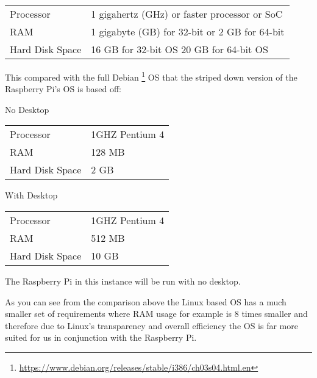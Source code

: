 
\vspace{5mm} 
\begin{center}
\begin{tabular}{| l | l |}
	\hline
	Processor & 1 gigahertz (GHz) or faster processor or SoC \\
	RAM & 1 gigabyte (GB) for 32-bit or 2 GB for 64-bit \\
	Hard Disk Space & 16 GB for 32-bit OS 20 GB for 64-bit OS \\
	\hline
\end{tabular}
\vspace{5mm} 
\end{center}

This compared with the full Debian \footnote{\url{https://www.debian.org/releases/stable/i386/ch03s04.html.en}} OS that the striped down version of the Raspberry Pi's OS is based off:

\begin{center}
No Desktop\\
\vspace{1mm} 
\begin{tabular}{| l | l |}
	\hline
	Processor & 1GHZ Pentium 4 \\
	RAM & 128 MB \\
	Hard Disk Space & 2 GB \\
	\hline
\end{tabular}

\vspace{2.5mm}
With Desktop\\
\vspace{1mm}
\begin{tabular}{| l | l |}
	\hline
	Processor & 1GHZ Pentium 4 \\
	RAM & 512 MB \\
	Hard Disk Space & 10 GB \\
	\hline
\end{tabular}
\vspace{5mm}
\end{center}

The Raspberry Pi in this instance will be run with no desktop.

As you can see from the comparison above the Linux based OS has a much smaller set of requirements where RAM usage for example is 8 times smaller and therefore due to Linux's transparency and overall efficiency the OS is far more suited for us in conjunction with the Raspberry Pi.

